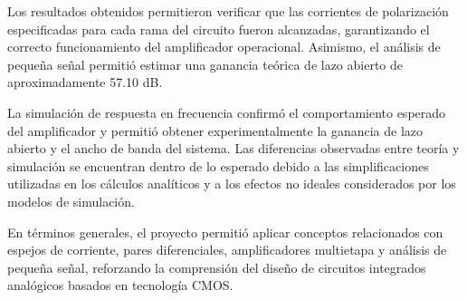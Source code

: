 \documentclass[journal]{IEEEtran}
\begin{document}
Los resultados obtenidos permitieron verificar que las corrientes de polarización especificadas para cada rama del circuito fueron alcanzadas, garantizando el correcto funcionamiento del amplificador operacional. Asimismo, el análisis de pequeña señal permitió estimar una ganancia teórica de lazo abierto de aproximadamente 57.10 dB.

La simulación de respuesta en frecuencia confirmó el comportamiento esperado del amplificador y permitió obtener experimentalmente la ganancia de lazo abierto y el ancho de banda del sistema. Las diferencias observadas entre teoría y simulación se encuentran dentro de lo esperado debido a las simplificaciones utilizadas en los cálculos analíticos y a los efectos no ideales considerados por los modelos de simulación.

En términos generales, el proyecto permitió aplicar conceptos relacionados con espejos de corriente, pares diferenciales, amplificadores multietapa y análisis de pequeña señal, reforzando la comprensión del diseño de circuitos integrados analógicos basados en tecnología CMOS.

\nocite{*}



\end{document}
